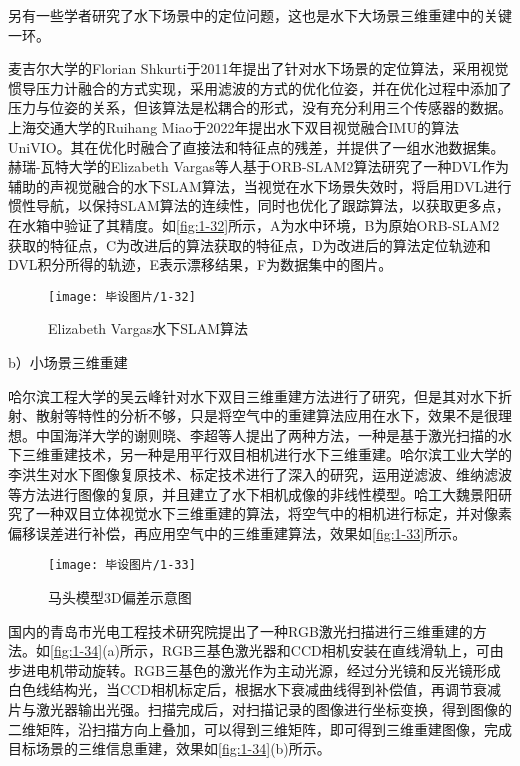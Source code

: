 另有一些学者研究了水下场景中的定位问题，这也是水下大场景三维重建中的关键一环。

麦吉尔大学的Florian Shkurti\cite{SHKURTI}于2011年提出了针对水下场景的定位算法，采用视觉惯导压力计融合的方式实现，采用滤波的方式的优化位姿，并在优化过程中添加了压力与位姿的关系，但该算法是松耦合的形式，没有充分利用三个传感器的数据。上海交通大学的Ruihang Miao于2022年提出水下双目视觉融合IMU的算法UniVIO\cite{MIAO}。其在优化时融合了直接法和特征点的残差，并提供了一组水池数据集。赫瑞-瓦特大学的Elizabeth Vargas等人基于ORB-SLAM2算法研究了一种DVL作为辅助的声视觉融合的水下SLAM算法，当视觉在水下场景失效时，将启用DVL进行惯性导航，以保持SLAM算法的连续性，同时也优化了跟踪算法，以获取更多点，在水箱中验证了其精度。如\autoref{fig:1-32}所示，A为水中环境，B为原始ORB-SLAM2获取的特征点，C为改进后的算法获取的特征点，D为改进后的算法定位轨迹和DVL积分所得的轨迹，E表示漂移结果，F为数据集中的图片\cite{Vargas}。

\begin{figure}[htbp]
    \centering
    \texttt{[image: 毕设图片/1-32]}
    \caption{\label{fig:1-32}Elizabeth Vargas水下SLAM算法\cite{Vargas}}
\end{figure}

b）小场景三维重建

哈尔滨工程大学的吴云峰针对水下双目三维重建方法进行了研究\cite{吴云峰}，但是其对水下折射、散射等特性的分析不够，只是将空气中的重建算法应用在水下，效果不是很理想。中国海洋大学的谢则晓、李超等人提出了两种方法，一种是基于激光扫描的水下三维重建技术\cite{解则晓}，另一种是用平行双目相机进行水下三维重建\cite{李超}。哈尔滨工业大学的李洪生对水下图像复原技术\cite{李洪生}、标定技术进行了深入的研究，运用逆滤波、维纳滤波等方法进行图像的复原，并且建立了水下相机成像的非线性模型。哈工大魏景阳研究了一种双目立体视觉水下三维重建的算法，将空气中的相机进行标定，并对像素偏移误差进行补偿，再应用空气中的三维重建算法，效果如\autoref{fig:1-33}所示\cite{魏景阳}。

\begin{figure}[htbp]
    \centering
    \texttt{[image: 毕设图片/1-33]}
    \caption{\label{fig:1-33}马头模型3D偏差示意图}
\end{figure}

国内的青岛市光电工程技术研究院提出了一种RGB激光扫描进行三维重建的方法\cite{董会}。如\autoref{fig:1-34}(a)所示，RGB三基色激光器和CCD相机安装在直线滑轨上，可由步进电机带动旋转。RGB三基色的激光作为主动光源，经过分光镜和反光镜形成白色线结构光，当CCD相机标定后，根据水下衰减曲线得到补偿值，再调节衰减片与激光器输出光强。扫描完成后，对扫描记录的图像进行坐标变换，得到图像的二维矩阵，沿扫描方向上叠加，可以得到三维矩阵，即可得到三维重建图像，完成目标场景的三维信息重建，效果如\autoref{fig:1-34}(b)所示。


